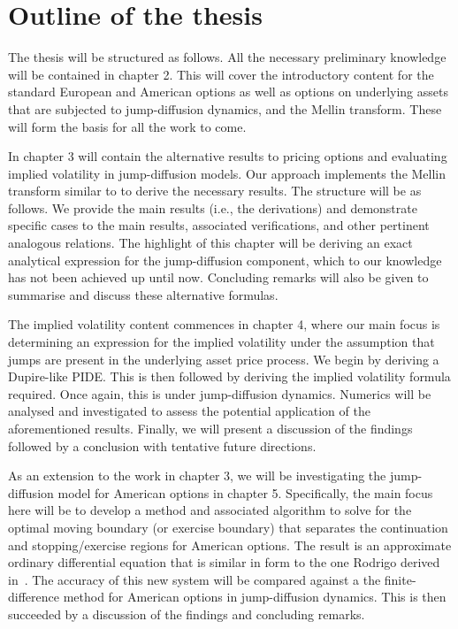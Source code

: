 		
		
		
\section{Outline of the thesis}
		The thesis will be structured as follows. All the necessary preliminary knowledge will be contained in chapter 2. This will cover the introductory content for the standard European and American options as well as options on underlying assets that are subjected to jump-diffusion dynamics, and the Mellin transform. These will form the basis for all the work to come. 
		
		In chapter 3 will contain the alternative results to pricing options and evaluating implied volatility in jump-diffusion models. Our approach implements the Mellin transform similar to \cite{Frontczak2013} to derive the necessary results. The structure will be as follows. We provide the main results (i.e., the derivations) and demonstrate specific cases to the main results, associated verifications, and other pertinent analogous relations. The highlight of this chapter will be deriving an exact analytical expression for the jump-diffusion component, which to our knowledge has not been achieved up until now. Concluding remarks will also be given to summarise and discuss these alternative formulas.
		 
		The implied volatility content commences in chapter 4, where our main focus is determining an expression for the implied volatility under the assumption that jumps are present in the underlying asset price process. We begin by deriving a Dupire-like PIDE. This is then followed by deriving the implied volatility formula required. Once again, this is under jump-diffusion dynamics. Numerics will be analysed and investigated to assess the potential application of the aforementioned results. Finally, we will present a discussion of the findings followed by a conclusion with tentative future directions.
		
		As an extension to the work in chapter 3, we will be investigating the jump-diffusion model for American options in chapter 5. Specifically, the main focus here will be to develop a method and associated algorithm to solve for the optimal moving boundary (or exercise boundary) that separates the continuation and stopping/exercise regions for American options. The result is an approximate ordinary differential equation that is similar in form to the one Rodrigo derived in~\cite{Rodrigo2013}. The accuracy of this new system will be compared against a the finite-difference method for American options in jump-diffusion dynamics. This is then succeeded by a discussion of the findings and concluding remarks.
		
